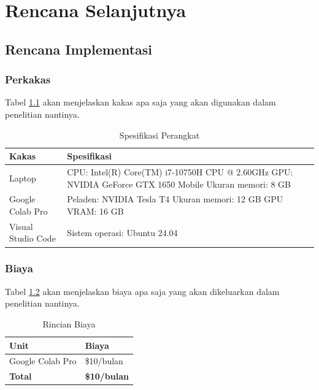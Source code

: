 \chapter{Rencana Selanjutnya}

\section{Rencana Implementasi}
\subsection{Perkakas}
Tabel \ref{table:specifications} akan menjelaskan kakas apa saja yang akan digunakan dalam penelitian nantinya. 

\begin{table}[H]
\centering
\caption{Spesifikasi Perangkat}
\label{table:specifications}
\begin{tabular}{|p{4cm}|p{11cm}|}
\hline
\textbf{Kakas} & \textbf{Spesifikasi} \\
\hline
Laptop &
CPU: Intel(R) Core(TM) i7-10750H CPU @ 2.60GHz \newline
GPU: NVIDIA GeForce GTX 1650 Mobile \newline
Ukuran memori: 8 GB \\
\hline
Google Colab Pro &
Peladen: NVIDIA Tesla T4 \newline
Ukuran memori: 12 GB \newline
GPU VRAM: 16 GB \\
\hline
Visual Studio Code &
Sistem operasi: Ubuntu 24.04 \\
\hline
\end{tabular}
\end{table}

\subsection{Biaya}

Tabel \ref{table:biaya} akan menjelaskan biaya apa saja yang akan dikeluarkan dalam penelitian nantinya. 

\begin{table}[H]
\centering
\caption{Rincian Biaya}
\label{table:biaya}
\begin{tabular}{|p{6cm}|p{6cm}|}
\hline
\textbf{Unit} & \textbf{Biaya} \\
\hline
Google Colab Pro & \$10/bulan \\
\hline
\textbf{Total} & \textbf{\$10/bulan} \\
\hline
\end{tabular}
\end{table}




